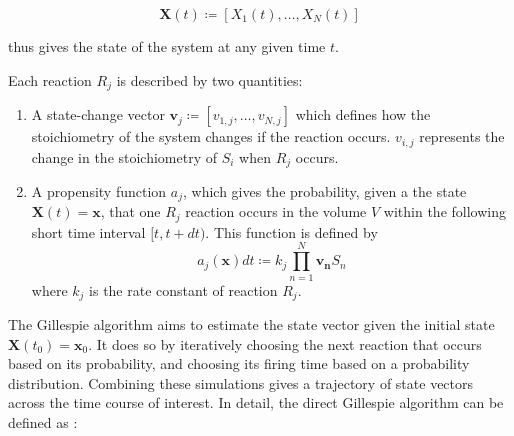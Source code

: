 \begin{equation}
  \mathbf{X}(t) \coloneqq [X_{1}(t), \ldots , X_{N}(t)]
  \label{eq:gillespie-statevector}
\end{equation}

thus gives the state of the system at any given time $t$.

Each reaction $R_{j}$ is described by two quantities:
\begin{enumerate}
  \item A state-change vector $\mathbf{v}_{j} \coloneqq [v_{1,j}, \ldots , v_{N,j}]$ which defines how the stoichiometry of the system changes if the reaction occurs.
        $v_{i,j}$ represents the change in the stoichiometry of $S_{i}$ when $R_{j}$ occurs.
  \item A propensity function $a_{j}$, which gives the probability, given a the state $\mathbf{X}(t) = \mathbf{x}$, that one $R_{j}$ reaction occurs in the volume $V$ within the following short time interval $[t, t+dt)$.
        This function is defined by
        \begin{equation}
          a_{j}(\mathbf{x})dt \coloneqq k_{j} \prod_{n=1}^{N}\mathbf{v_{n}}S_{n}
          \label{eq:gillespie-propensity}
        \end{equation}
        where $k_{j}$ is the rate constant of reaction $R_{j}$.
\end{enumerate}

The Gillespie algorithm aims to estimate the state vector given the initial state $\mathbf{X}(t_{0}) = \mathbf{x}_{0}$.
It does so by iteratively choosing the next reaction that occurs based on its probability, and choosing its firing time based on a probability distribution.
Combining these simulations gives a trajectory of state vectors across the time course of interest.
In detail, the direct Gillespie algorithm can be defined as \parencite{gillespieStochasticSimulationChemical2007}:

